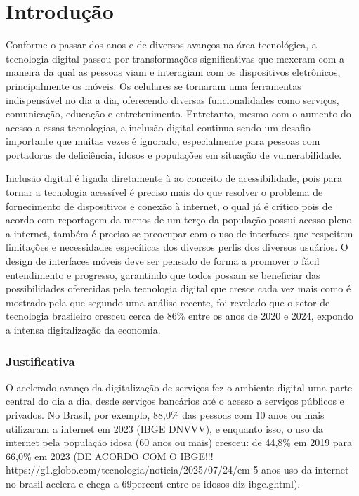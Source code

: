 \chapter{Introdução}

Conforme o passar dos anos e de diversos avanços na área tecnológica, a tecnologia digital passou por transformações significativas que mexeram com a maneira da qual as pessoas viam e interagiam com os dispositivos eletrônicos, principalmente os móveis. Os celulares se tornaram uma ferramentas indispensável no dia a dia, oferecendo diversas funcionalidades como serviços, comunicação, educação e entretenimento. Entretanto, mesmo com o aumento do acesso a essas tecnologias, a inclusão digital continua sendo um desafio importante que muitas vezes é ignorado, especialmente para pessoas com portadoras de deficiência, idosos e populações em situação de vulnerabilidade.

Inclusão digital é ligada diretamente à ao conceito de acessibilidade, pois para tornar a tecnologia acessível é preciso mais do que resolver o problema de fornecimento de dispositivos e conexão à internet, o qual já é crítico pois de acordo com reportagem da \cite{g1_acesso_pleno_internet_2022} menos de um terço da população possui acesso pleno a internet, também é preciso se preocupar com o uso de interfaces que respeitem limitações e necessidades específicas dos diversos perfis dos diversos usuários. O design de interfaces móveis deve ser pensado de forma a promover o fácil entendimento e progresso, garantindo que todos possam se beneficiar das possibilidades oferecidas pela tecnologia digital que cresce cada vez mais como é mostrado pela \cite{veja_pais_se_digitaliza_2024} que segundo uma análise recente, foi revelado que o setor de tecnologia brasileiro cresceu cerca de 86\% entre os anos de 2020 e 2024, expondo a intensa digitalização da economia.

\subsection*{Justificativa}

O acelerado avanço da digitalização de serviços fez o ambiente digital uma parte central do dia a dia, desde serviços bancários até o acesso a serviços públicos e privados. No Brasil, por exemplo, 88,0\% das pessoas com 10 anos ou mais utilizaram a internet em 2023 (IBGE DNVVV), e enquanto isso, o uso da internet pela população idosa (60 anos ou mais) cresceu: de 44,8\% em 2019 para 66,0\% em 2023 (DE ACORDO COM O IBGE!!! https://g1.globo.com/tecnologia/noticia/2025/07/24/em-5-anos-uso-da-internet-no-brasil-acelera-e-chega-a-69percent-entre-os-idosos-diz-ibge.ghtml).

